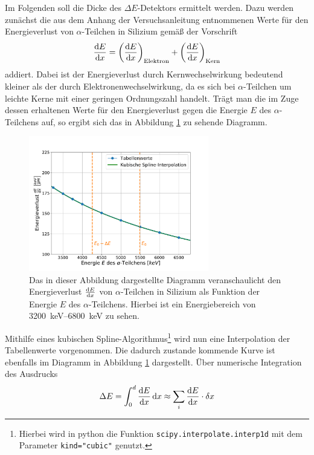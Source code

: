 Im Folgenden soll die Dicke des $\Delta E$-Detektors ermittelt werden.
Dazu werden zunächst die aus dem Anhang der Versuchsanleitung\cite{wwu} entnommenen Werte für den Energieverlust von $\alpha$-Teilchen in Silizium gemäß der Vorschrift
\begin{align}
	\dv{E}{x}= \left( \dv{E}{x}\right)_\text{Elektron} + \left(\dv{E}{x}\right)_\text{Kern}
\end{align}
addiert.
Dabei ist der Energieverlust durch Kernwechselwirkung bedeutend kleiner als der durch Elektronenwechselwirkung, da es sich bei $\alpha$-Teilchen um leichte Kerne mit einer geringen Ordnungszahl handelt.
Trägt man die im Zuge dessen erhaltenen Werte für den Energieverlust gegen die Energie $E$ des $\alpha$-Teilchens auf, so ergibt sich das in Abbildung \ref{EnergyLossSpectrum} zu sehende Diagramm.
\begin{figure}[ht]
	\centering
	\includegraphics[width=0.7\textwidth]{src/EnergyLossSpectrum}
	\caption{Das in dieser Abbildung dargestellte Diagramm veranschaulicht den Energieverlust $\dv{E}{x}$ von $\alpha$-Teilchen in Silizium als Funktion der Energie $E$ des $\alpha$-Teilchens. Hierbei ist ein Energiebereich von \SIrange{3200}{6800}{\kilo\electronvolt} zu sehen.}
	\label{EnergyLossSpectrum}
\end{figure}
Mithilfe eines kubischen Spline-Algorithmus\footnote{Hierbei wird in python die Funktion \texttt{scipy.interpolate.interp1d} mit dem Parameter \texttt{kind="cubic"} genutzt.} wird nun eine Interpolation der Tabellenwerte vorgenommen.
Die dadurch zustande kommende Kurve ist ebenfalls im Diagramm in Abbildung \ref{EnergyLossSpectrum} dargestellt.
Über numerische Integration des Ausdrucks
\begin{align}
	\label{eq:numInt}
	\Delta E = \int_{0}^{d} \dv{E}{x} (E) \dd{x} \approx \sum_i \dv{E}{x} (E_i) \cdot \delta x
\end{align}
